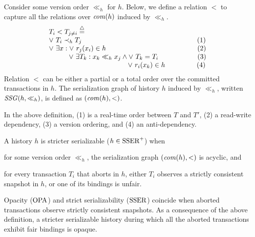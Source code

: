 \begin{definition}
  Consider some version order $\ll_h$ for $h$.
  Below, we define a relation $<$ to capture all the relations over $\committed{h}$ induced by $\ll_h$.
    \begin{displaymath}
    \begin{array}{l}
      T_i < T_{j \neq i}  \equaldef \\
      \lor~ T_i \hb_h T_j {\hspace{16.8em}\text{(1)}} \\
      \lor~ \exists x : \lor~ r_j(x_i) \in h {\hspace{13.3em}\text{(2)}} \\
      \hspace{2.9em}\lor~ \exists T_k : x_k \ll_h x_j \land \lor~T_k = T_i {\hspace{5.7em}\text{(3)}} \\
      \hspace{11.5em} \lor~ r_i(x_k) \in h {\hspace{4.6em}\text{(4)}}
    \end{array}
  \end{displaymath}  
  Relation $<$ can be either a partial or a total order over the committed transactions in $h$.
  The serialization graph of history $h$ induced by $\ll_h$, written $\SSG(h,\ll_h)$, is defined as $(\committed{h},<)$.
\end{definition}
In the above definition, (1) is a real-time order between $T$ and $T'$, (2) a read-write dependency, (3) a version ordering, and (4) an anti-dependency.

\begin{definition}
  A history $h$ is stricter serializable ($h \in \SPSER$) when
  \begin{inparaenum}
  \item for some version order $\ll_h$, the serialization graph $(\committed{h},<)$ is acyclic, and
  \item for every transaction $T_i$ that aborts in $h$, either $T_i$ observes a strictly consistent snapshot in $h$, or one of its bindings is unfair.
  \end{inparaenum}
\end{definition}

Opacity ($\OPA$) and strict serializability ($\SSER$) coincide when aborted transactions observe strictly consistent snapshots.
As a consequence of the above definition, a stricter serializable history during which all the aborted transactions exhibit fair bindings is opaque.


